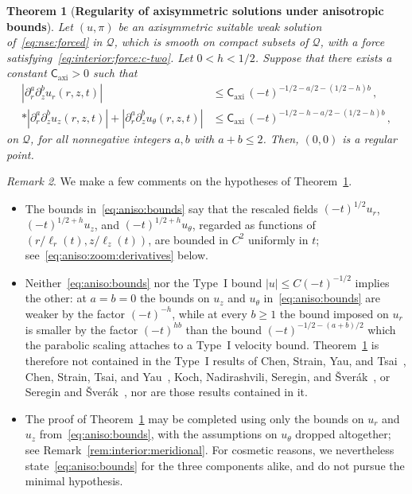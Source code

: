 \documentclass[11pt,reqno]{amsproc}
\numberwithin{equation}{section}
\newtheorem{theorem}{Theorem}[section]
\theoremstyle{remark}
\newtheorem{remark}[theorem]{Remark}
\newcommand{\p}{\partial}
\newcommand{\Caxi}{\mathsf{C}_{\mathrm{axi}}}
\begin{document}
\begin{theorem}[{\bf Regularity of axisymmetric solutions under anisotropic bounds}]
\label{thm:aniso:main}
Let $(u,\pi)$ be an axisymmetric suitable weak solution of~\eqref{eq:nse:forced} in $\mathcal Q$, which is smooth on compact subsets of $\mathcal Q$, with a force satisfying~\eqref{eq:interior:force:c-two}. Let $0<h<1/2$. Suppose that there exists a constant $\Caxi>0$ such that
\begin{subequations}
\label{eq:aniso:bounds}
\begin{align}
|\p_r^a\p_z^b u_r(r,z,t)|
&\le \Caxi\,(-t)^{-1/2-a/2-(1/2-h)b}\,,
\\*
|\p_r^a\p_z^b u_z(r,z,t)|+|\p_r^a\p_z^b u_\theta(r,z,t)|
&\le \Caxi\,(-t)^{-1/2-h-a/2-(1/2-h)b}
\,,
\end{align}
\end{subequations}
on $\mathcal Q$, for all nonnegative integers $a,b$ with $a+b\le2$. Then, $(0,0)$ is a regular point.
\end{theorem}

\begin{remark}
\label{rem:aniso:comments}
We make a few comments on the hypotheses of Theorem~\ref{thm:aniso:main}.
\begin{itemize}[leftmargin=2em]
\item[(a)] The bounds in~\eqref{eq:aniso:bounds} say that the rescaled fields $(-t)^{1/2}u_r$, $(-t)^{1/2+h}u_z$, and $(-t)^{1/2+h}u_\theta$, regarded as functions of $(r/\ell_r(t),z/\ell_z(t))$, are bounded in $C^2$ uniformly in $t$; see~\eqref{eq:aniso:zoom:derivatives} below.
\item[(b)] Neither~\eqref{eq:aniso:bounds} nor the Type~I bound $|u|\le C(-t)^{-1/2}$ implies the other: at $a=b=0$ the bounds on $u_z$ and $u_\theta$ in~\eqref{eq:aniso:bounds} are weaker by the factor $(-t)^{-h}$, while at every $b\ge1$ the bound imposed on $u_r$ is smaller by the factor $(-t)^{hb}$ than the bound $(-t)^{-1/2-(a+b)/2}$ which the parabolic scaling attaches to a Type~I velocity bound. Theorem~\ref{thm:aniso:main} is therefore not contained in the Type~I results of Chen, Strain, Yau, and Tsai~\cite{CSTY08}, Chen, Strain, Tsai, and Yau~\cite{CSTY09}, Koch, Nadirashvili, Seregin, and \v{S}ver\'ak~\cite{KNSS09}, or Seregin and \v{S}ver\'ak~\cite{SereginSverak09}, nor are those results contained in it.
\item[(c)] The proof of Theorem~\ref{thm:aniso:main} may be completed using only the bounds on $u_r$ and $u_z$ from~\eqref{eq:aniso:bounds}, with the assumptions on $u_\theta$ dropped altogether; see Remark~\ref{rem:interior:meridional}. For cosmetic reasons, we nevertheless state~\eqref{eq:aniso:bounds} for the three components alike, and do not pursue the minimal hypothesis.
\end{itemize}
\end{remark}
\end{document}
